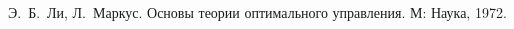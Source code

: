 


        
        
        \tableofcontents

        
        

        \begin{thebibliography}{9}
                Э.~Б.~Ли, Л.~Маркус. Основы теории оптимального управления. М: Наука, 1972.
        \end{thebibliography}
